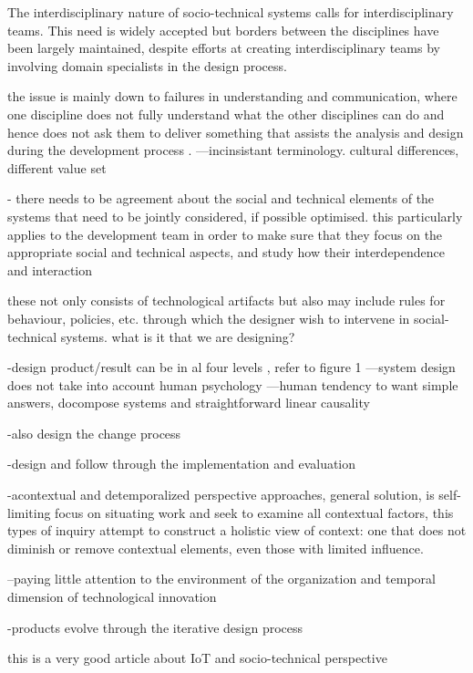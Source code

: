 \begin{svgraybox}

The interdisciplinary nature of socio-technical systems calls for interdisciplinary teams. This need is widely accepted but borders between the disciplines have been largely maintained, despite efforts at creating interdisciplinary teams by involving domain specialists in the design process. 


the issue is mainly down to failures in understanding and communication, where one discipline does not fully understand what the other disciplines can do and hence does not ask them to deliver something that assists the analysis and design during the development process \cite{Baxter2011}. ---incinsistant terminology. cultural differences, different value set







- there needs to be agreement about the social and technical elements of the systems that need to be jointly considered, if possible optimised. this particularly applies to the development team in order to make sure that they focus on the appropriate social and technical aspects, and study how their interdependence and interaction 






 these not only consists of technological artifacts but also may include rules for behaviour, policies, etc. through which the designer wish to intervene in social-technical systems. what is it that we are designing? 

-design product/result can be in al four levels , refer to figure 1
---system design does not take into account human psychology
---human tendency to want simple answers, docompose systems and straightforward linear causality 

-also design the change process

-design and follow through the implementation and evaluation 

-acontextual and detemporalized perspective approaches, general solution, is self-limiting 
focus on situating work and seek to examine all contextual factors, this types of inquiry attempt to construct a holistic view of context: one that does not diminish or remove contextual elements, even those with limited influence. 

--paying little attention to the environment of the organization and temporal dimension of technological innovation  \cite{Sawyer2014}

-products evolve through the iterative design process

\end{svgraybox}


\begin{svgraybox}

\item \cite{Shin2014} this is a very good article about IoT and socio-technical perspective 

\end{svgraybox}

